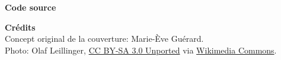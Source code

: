 \begin{frame}[t,plain,fragile=singleslide]
\begin{adjustwidth}{15mm}{15mm}
    \textbf{Code source} \\
    \viewsource{\ghurl}

    \textbf{Crédits} \\
    Concept original de la couverture: Marie-Ève Guérard. \\
    Photo: Olaf Leillinger,
    \href{https://creativecommons.org/licenses/by-sa/3.0/deed.en}{CC
      BY-SA 3.0 Unported} via
    \href{https://commons.wikimedia.org/wiki/File:Suricata.suricatta.6861.jpg}{%
      Wikimedia Commons}. \\
  \end{adjustwidth}
\end{frame}

